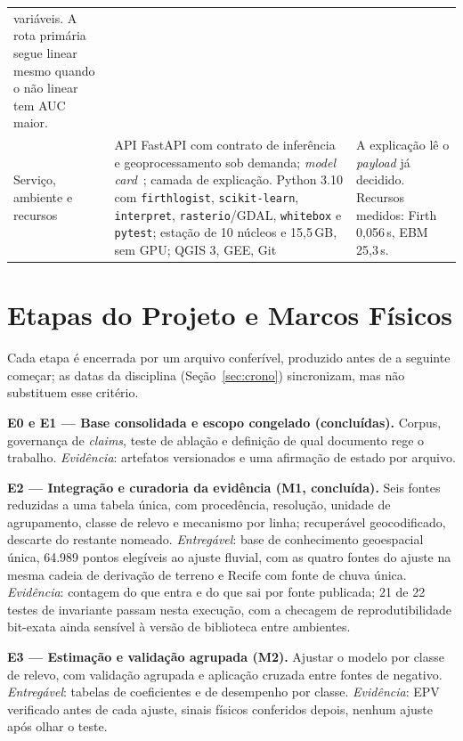 \documentclass[conference]{IEEEtran}
\begin{document}
\begin{table}[!t]
\begin{tabular}{@{}>{\raggedright\arraybackslash}p{2.05cm}>{\raggedright\arraybackslash}p{7.6cm}>{\raggedright\arraybackslash}p{6.5cm}@{}}
variáveis. A rota primária segue linear mesmo quando o não linear tem AUC maior. \\
Serviço, ambiente e recursos &
API FastAPI com contrato de inferência e geoprocessamento sob demanda; \emph{model
card}~\cite{mitchell2019}; camada de explicação. Python 3.10 com \texttt{firthlogist},
\texttt{scikit-learn}, \texttt{interpret}, \texttt{rasterio}/GDAL, \texttt{whitebox} e
\texttt{pytest}; estação de 10 núcleos e 15,5\,GB, sem GPU; QGIS 3, GEE, Git &
A explicação lê o \emph{payload} já decidido. Recursos medidos: Firth 0,056\,s,
EBM 25,3\,s. \\
\bottomrule
\end{tabular}
\end{table}

\section{Etapas do Projeto e Marcos Físicos}
\label{sec:etapas}

Cada etapa é encerrada por um arquivo conferível, produzido antes de a seguinte
começar; as datas da disciplina (Seção~\ref{sec:crono}) sincronizam, mas não
substituem esse critério.

\textbf{E0 e E1 --- Base consolidada e escopo congelado (concluídas).} Corpus,
governança de \emph{claims}, teste de ablação e definição de qual documento rege
o trabalho. \emph{Evidência}: artefatos versionados e uma afirmação de estado por
arquivo.

\textbf{E2 --- Integração e curadoria da evidência (M1, concluída).} Seis fontes
reduzidas a uma tabela única, com procedência, resolução, unidade de
agrupamento, classe de relevo e mecanismo por linha; recuperável geocodificado,
descarte do restante nomeado. \emph{Entregável}: base de conhecimento
geoespacial única, 64.989 pontos elegíveis ao ajuste fluvial, com as quatro
fontes do ajuste na mesma cadeia de derivação de terreno e Recife com fonte de
chuva única. \emph{Evidência}: contagem do que entra e do que sai por fonte
publicada; 21 de 22 testes de invariante passam nesta execução, com a
checagem de reprodutibilidade bit-exata ainda sensível à versão de biblioteca
entre ambientes.

\textbf{E3 --- Estimação e validação agrupada (M2).} Ajustar o modelo por classe
de relevo, com validação agrupada e aplicação cruzada entre fontes de negativo.
\emph{Entregável}: tabelas de coeficientes e de desempenho por classe.
\emph{Evidência}: EPV verificado antes de cada ajuste, sinais físicos conferidos
depois, nenhum ajuste após olhar o teste.
\end{document}
